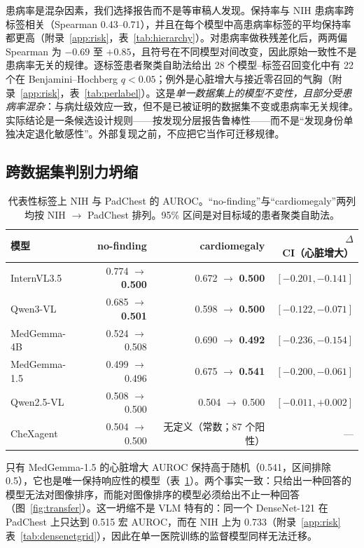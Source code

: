 患病率是混杂因素，我们选择报告而不是等审稿人发现。保持率与 NIH 患病率跨标签相关（Spearman 0.43--0.71），并且在每个模型中高患病率标签的平均保持率都更高（附录~\ref{app:risk}，表~\ref{tab:hierarchy}）。对患病率做秩残差化后，两两偏 Spearman 为 $-0.69$ 至 $+0.85$，且符号在不同模型对间改变，因此原始一致性不是患病率无关的规律。逐标签患者聚类自助法给出 28 个模型--标签召回变化中有 22 个在 Benjamini--Hochberg $q<0.05$；例外是心脏增大与接近零召回的气胸（附录~\ref{app:risk}，表~\ref{tab:perlabel}）。这是\emph{单一数据集上的模型不变性，且部分受患病率混杂}：与病灶级效应一致，但不是已被证明的数据集不变或患病率无关规律。实际结论是一条候选设计规则——按发现分层报告鲁棒性——而不是``发现身份单独决定退化敏感性''。外部复现之前，不应把它当作可迁移规律。

\subsection{跨数据集判别力坍缩}
\label{sec:results-transfer}

\begin{table}[t]
\centering
\small
\caption{代表性标签上 NIH 与 PadChest 的 AUROC。``no-finding''与``cardiomegaly''两列均按 NIH $\rightarrow$ PadChest 排列。95\% 区间是对目标域的患者聚类自助法。}
\label{tab:transfer}
\begin{tabular}{lrrr}
\toprule
模型 & no-finding & cardiomegaly & $\Delta$CI（心脏增大） \\
\midrule
InternVL3.5 & 0.774 $\rightarrow$ \textbf{0.500} & 0.672 $\rightarrow$ \textbf{0.500} & $[-0.201,-0.141]$ \\
Qwen3-VL & 0.685 $\rightarrow$ \textbf{0.501} & 0.598 $\rightarrow$ \textbf{0.500} & $[-0.122,-0.071]$ \\
MedGemma-4B & 0.524 $\rightarrow$ 0.508 & 0.690 $\rightarrow$ \textbf{0.492} & $[-0.236,-0.154]$ \\
MedGemma-1.5 & 0.499 $\rightarrow$ 0.496 & 0.675 $\rightarrow$ \textbf{0.541} & $[-0.200,-0.061]$ \\
Qwen2.5-VL & 0.508 $\rightarrow$ 0.500 & 0.504 $\rightarrow$ 0.500 & $[-0.011,+0.002]$ \\
CheXagent & 0.504 $\rightarrow$ 0.500 & 无定义（常数；87 个阳性） & --- \\
\bottomrule
\end{tabular}
\end{table}

只有 MedGemma-1.5 的心脏增大 AUROC 保持高于随机（0.541，区间排除 0.5），它也是唯一保持响应性的模型（表~\ref{tab:transfer}）。两个事实一致：只给出一种回答的模型无法对图像排序，而能对图像排序的模型必须给出不止一种回答（图~\ref{fig:transfer}）。这一坍缩不是 VLM 特有的：同一个 DenseNet-121 在 PadChest 上只达到 0.515 宏 AUROC，而在 NIH 上为 0.733（附录~\ref{app:risk} 表~\ref{tab:densenetgrid}），因此在单一医院训练的监督模型同样无法迁移。

